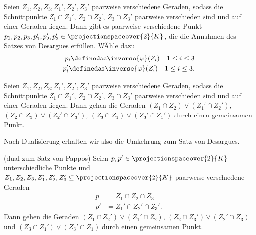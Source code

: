 Seien \( Z_1,Z_2,Z_3,Z_1',Z_2',Z_3' \) paarweise verschiedene Geraden, sodass die Schnittpunkte \( Z_1\cap Z_1' \), \( Z_2\cap Z_2' \), \( Z_3\cap Z_3' \) paarweise verschieden sind und auf einer Geraden liegen. Dann gibt es paarweise verschiedene Punkt \( p_1,p_2,p_3,p_1',p_2',p_3'\in \projectionspaceover{2}{K} \), die die Annahmen des Satzes von Desargues erfüllen. WÄhle dazu
\begin{align*}
  p_i\definedas \inverse{\varphi}(Z_i)\quad 1\leq i\leq 3\\
  p_i'\definedas \inverse{\varphi}(Z_i')\quad 1\leq i\leq 3.
\end{align*}
\begin{satz*}
  Seien \( Z_1,Z_2,Z_3,Z_1',Z_2',Z_3' \) paarweise verschiedene Geraden, sodass die Schnittpunkte \( Z_1\cap Z_1' \), \( Z_2\cap Z_2' \), \( Z_3\cap Z_3' \) paarweise verschieden sind und auf einer Geraden liegen. Dann gehen die Geraden \( (Z_1\cap Z_2)\vee (Z_1'\cap Z_2') \), \( (Z_2\cap Z_3)\vee (Z_2'\cap Z_3') \), \( (Z_3\cap Z_1)\vee (Z_3'\cap Z_1') \) durch einen gemeinsamen Punkt.
\end{satz*}
\begin{bemerkung*}
  Nach Dualisierung erhalten wir also die Umkehrung zum Satz von Desargues.
\end{bemerkung*}
\begin{satz*}[Brianchon]
  (dual zum Satz von Pappos) Seien \( p,p'\in \projectionspaceover{2}{K} \) unterschiedliche Punkte und \( Z_1,Z_2,Z_3,Z_1',Z_2',Z_3'\subseteq \projectionspaceover{2}{K} \) paarweise verschiedene Geraden 
  \begin{align*}
    p&=Z_1\cap Z_2\cap Z_3\\
    p'&=Z_1'\cap Z_2'\cap Z_3'.
  \end{align*}
  Dann gehen die Geraden \( (Z_1\cap Z_2')\vee (Z_1'\cap Z_2) \), \( (Z_2\cap Z_3')\vee (Z_2'\cap Z_3) \) und \( (Z_3\cap Z_1')\vee (Z_3'\cap Z_1)\) durch einen gemeinsamen Punkt.
  
\end{satz*}
